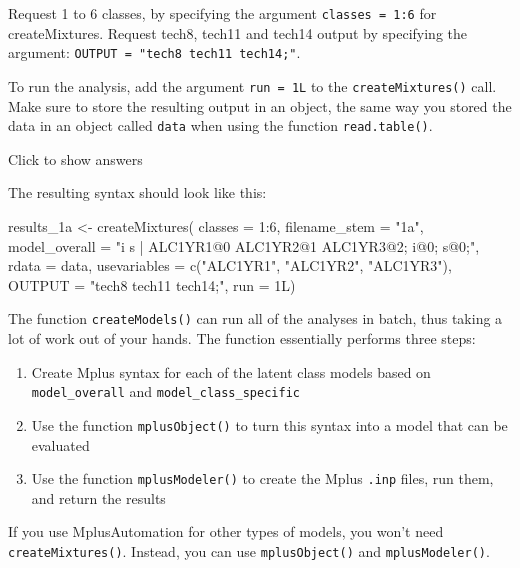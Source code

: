 \documentclass[
]{book}
\newenvironment{Shaded}{\begin{snugshade}}{\end{snugshade}}
\newcommand{\AttributeTok}[1]{\textcolor[rgb]{0.77,0.63,0.00}{#1}}
\newcommand{\DecValTok}[1]{\textcolor[rgb]{0.00,0.00,0.81}{#1}}
\newcommand{\FunctionTok}[1]{\textcolor[rgb]{0.00,0.00,0.00}{#1}}
\newcommand{\NormalTok}[1]{#1}
\newcommand{\OtherTok}[1]{\textcolor[rgb]{0.56,0.35,0.01}{#1}}
\newcommand{\SpecialCharTok}[1]{\textcolor[rgb]{0.00,0.00,0.00}{#1}}
\newcommand{\StringTok}[1]{\textcolor[rgb]{0.31,0.60,0.02}{#1}}
\providecommand{\tightlist}{%
  \setlength{\itemsep}{0pt}\setlength{\parskip}{0pt}}
\begin{document}
Request 1 to 6 classes, by specifying the argument \texttt{classes\ =\ 1:6} for createMixtures. Request tech8, tech11 and tech14 output by specifying the argument: \texttt{OUTPUT\ =\ "tech8\ tech11\ tech14;"}.

To run the analysis, add the argument \texttt{run\ =\ 1L} to the \texttt{createMixtures()} call.
Make sure to store the resulting output in an object, the same way you stored the data in an object called \texttt{data} when using the function \texttt{read.table()}.

Click to show answers

The resulting syntax should look like this:

\begin{Shaded}
\begin{Highlighting}[]
\NormalTok{results\_1a }\OtherTok{\textless{}{-}} \FunctionTok{createMixtures}\NormalTok{(}
  \AttributeTok{classes =} \DecValTok{1}\SpecialCharTok{:}\DecValTok{6}\NormalTok{,}
  \AttributeTok{filename\_stem =} \StringTok{"1a"}\NormalTok{,}
  \AttributeTok{model\_overall =} \StringTok{"i s | ALC1YR1@0 ALC1YR2@1 ALC1YR3@2;}
\StringTok{                   i@0;  s@0;"}\NormalTok{,}
  \AttributeTok{rdata =}\NormalTok{ data, }
  \AttributeTok{usevariables =} \FunctionTok{c}\NormalTok{(}\StringTok{"ALC1YR1"}\NormalTok{, }\StringTok{"ALC1YR2"}\NormalTok{, }\StringTok{"ALC1YR3"}\NormalTok{),}
  \AttributeTok{OUTPUT =} \StringTok{"tech8 tech11 tech14;"}\NormalTok{,}
  \AttributeTok{run =}\NormalTok{ 1L)}
\end{Highlighting}
\end{Shaded}

The function \texttt{createModels()} can run all of the analyses in batch, thus taking a lot of work out of your hands.
The function essentially performs three steps:

\begin{enumerate}
\def\labelenumi{\arabic{enumi}.}
\tightlist
\item
  Create Mplus syntax for each of the latent class models based on \texttt{model\_overall} and \texttt{model\_class\_specific}
\item
  Use the function \texttt{mplusObject()} to turn this syntax into a model that can be evaluated
\item
  Use the function \texttt{mplusModeler()} to create the Mplus \texttt{.inp} files, run them, and return the results
\end{enumerate}

If you use MplusAutomation for other types of models, you won't need \texttt{createMixtures()}. Instead, you can use \texttt{mplusObject()} and \texttt{mplusModeler()}.
\end{document}
